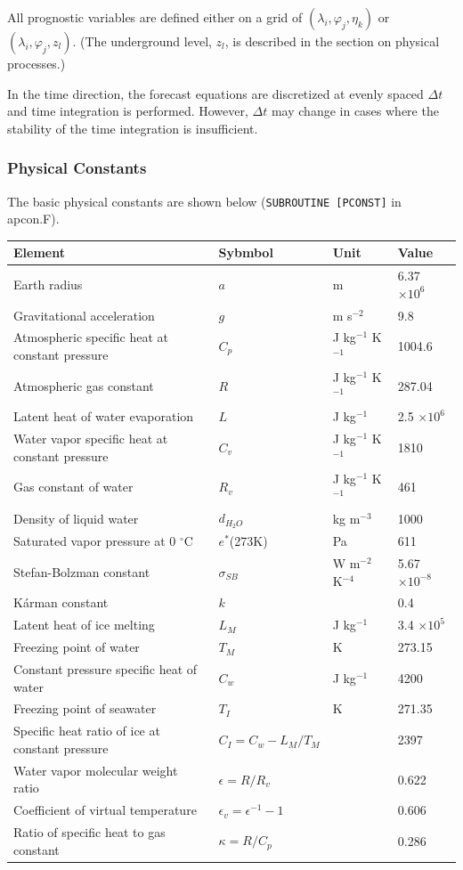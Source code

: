 All prognostic variables are defined either on a grid of
\((\lambda_i, \varphi_j, \eta_k)\) or \((\lambda_i, \varphi_j, z_l)\).
(The underground level, \(z_l\), is described in the section on physical
processes.)

In the time direction, the forecast equations are discretized at
evenly spaced \(\Delta t\) and time integration is performed.
However, \(\Delta t\) may change in cases where the stability of the time integration is insufficient.

\hypertarget{physical-constants}{%
\subsubsection{Physical Constants}\label{physical-constants}}

The basic physical constants are shown below
(\texttt{SUBROUTINE\ {[}PCONST{]}} in apcon.F).

\setlength\LTleft{0pt}\setlength\LTright{0pt}\begin{longtable}[]{@{}llll@{}}
\toprule\relax
Element & Sybmbol & Unit & Value\tabularnewline
\midrule\relax
\endhead
Earth radius & \(a\) & m & 6.37 \(\times 10^6\)\tabularnewline
Gravitational acceleration & \(g\) & m s\(^{-2}\) & 9.8\tabularnewline
Atmospheric specific heat at constant pressure & \(C_p\) & J kg\(^{-1}\)
K\(^{-1}\) & 1004.6\tabularnewline
Atmospheric gas constant & \(R\) & J kg\(^{-1}\) K\(^{-1}\) &
287.04\tabularnewline
Latent heat of water evaporation & \(L\) & J kg\(^{-1}\) & 2.5
\(\times 10^6\)\tabularnewline
Water vapor specific heat at constant pressure & \(C_v\) & J kg\(^{-1}\)
K\(^{-1}\) & 1810\tabularnewline
Gas constant of water & \(R_v\) & J kg\(^{-1}\) K\(^{-1}\) &
461\tabularnewline
Density of liquid water & \(d_{H_2O}\) & kg m\(^{-3}\) &
1000\tabularnewline
Saturated vapor pressure at 0 \(^{\circ}\)C & \(e^*\)(273K) & Pa &
611\tabularnewline
Stefan-Bolzman constant & \(\sigma_{SB}\) & W m\(^{-2}\) K\(^{-4}\) &
5.67 \(\times 10^{-8}\)\tabularnewline
Kárman constant & \(k\) & & 0.4\tabularnewline
Latent heat of ice melting & \(L_M\) & J kg\(^{-1}\) & 3.4
\(\times 10^5\)\tabularnewline
Freezing point of water & \(T_M\) & K & 273.15\tabularnewline
Constant pressure specific heat of water & \(C_w\) & J kg\(^{-1}\) &
4200\tabularnewline
Freezing point of seawater & \(T_I\) & K & 271.35\tabularnewline
Specific heat ratio of ice at constant pressure &
\(C_I = C_w - L_M/T_M\) & & 2397\tabularnewline
Water vapor molecular weight ratio & \(\epsilon = R/R_v\) & &
0.622\tabularnewline
Coefficient of virtual temperature & \(\epsilon_v = \epsilon^{-1} - 1\)
& & 0.606\tabularnewline
Ratio of specific heat to gas constant & \(\kappa = R/C_p\) & &
0.286\tabularnewline
\bottomrule
\end{longtable}
